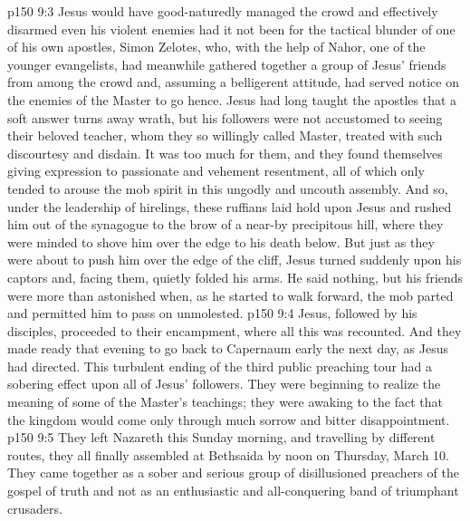 \vs p150 9:3 Jesus would have good\hyp{}naturedly managed the crowd and effectively disarmed even his violent enemies had it not been for the tactical blunder of one of his own apostles, Simon Zelotes, who, with the help of Nahor, one of the younger evangelists, had meanwhile gathered together a group of Jesus’ friends from among the crowd and, assuming a belligerent attitude, had served notice on the enemies of the Master to go hence. Jesus had long taught the apostles that a soft answer turns away wrath, but his followers were not accustomed to seeing their beloved teacher, whom they so willingly called Master, treated with such discourtesy and disdain. It was too much for them, and they found themselves giving expression to passionate and vehement resentment, all of which only tended to arouse the mob spirit in this ungodly and uncouth assembly. And so, under the leadership of hirelings, these ruffians laid hold upon Jesus and rushed him out of the synagogue to the brow of a near\hyp{}by precipitous hill, where they were minded to shove him over the edge to his death below. But just as they were about to push him over the edge of the cliff, Jesus turned suddenly upon his captors and, facing them, quietly folded his arms. He said nothing, but his friends were more than astonished when, as he started to walk forward, the mob parted and permitted him to pass on unmolested.
\vs p150 9:4 Jesus, followed by his disciples, proceeded to their encampment, where all this was recounted. And they made ready that evening to go back to Capernaum early the next day, as Jesus had directed. This turbulent ending of the third public preaching tour had a sobering effect upon all of Jesus’ followers. They were beginning to realize the meaning of some of the Master’s teachings; they were awaking to the fact that the kingdom would come only through much sorrow and bitter disappointment.
\vs p150 9:5 They left Nazareth this Sunday morning, and travelling by different routes, they all finally assembled at Bethsaida by noon on Thursday, March 10. They came together as a sober and serious group of disillusioned preachers of the gospel of truth and not as an enthusiastic and all\hyp{}conquering band of triumphant crusaders.
\quizlink
